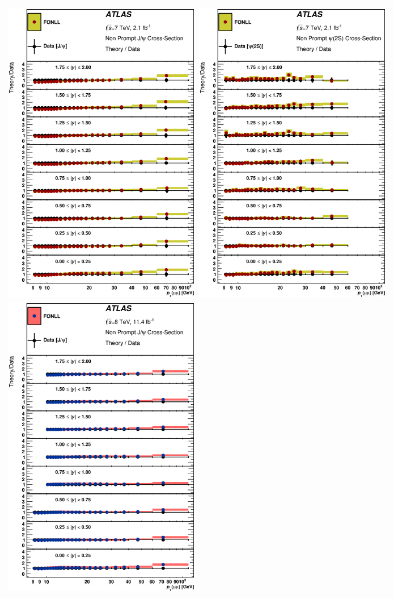 \begin{description}[style=unboxed,leftmargin=0cm]
\begin{figure} [!ht]
  \begin{center}
    \includegraphics[width=0.44\textwidth]{figures/ct_7TeV_JpsiNP_theoryRatio_lin.eps} 
    \includegraphics[width=0.44\textwidth]{figures/ct_7TeV_Psi2SNP_theoryRatio_lin.eps}\hfil\\
    \includegraphics[width=0.44\textwidth]{figures/ct_8TeV_JpsiNP_theoryRatio_lin.eps}

\end{center}
\end{figure}
\end{description}

